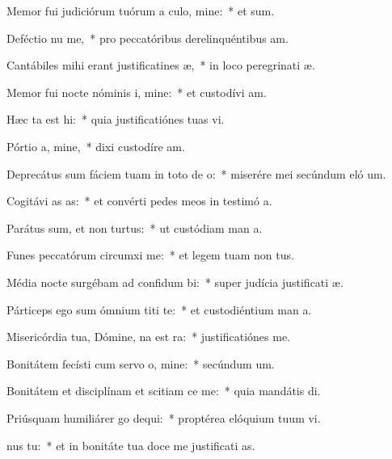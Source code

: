 \item Memor fui judiciórum tuórum a culo, mine:~* et  sum.
\item Deféctio nu me,~* pro peccatóribus derelinquéntibus  am.
\item Cantábiles mihi erant justificatines æ,~* in loco peregrinati æ.
\item Memor fui nocte nóminis i, mine:~* et custodívi  am.
\item Hæc ta est hi:~* quia justificatiónes tuas vi.
\item Pórtio a, mine,~* dixi custodíre  am.
\item Deprecátus sum fáciem tuam in toto de o:~* miserére mei secúndum eló um.
\item Cogitávi as as:~* et convérti pedes meos in testimó a.
\item Parátus sum, et non  turtus:~* ut custódiam man a.
\item Funes peccatórum circumxi  me:~* et legem tuam non  tus.
\item Média nocte surgébam ad confidum bi:~* super judícia justificati æ.
\item Párticeps ego sum ómnium titi te:~* et custodiéntium man a.
\item Misericórdia tua, Dómine, na est ra:~* justificatiónes   me.
\item Bonitátem fecísti cum servo o, mine:~* secúndum  um.
\item Bonitátem et disciplínam et scitiam ce me:~* quia mandátis  di.
\item Priúsquam humiliárer go dequi:~* proptérea elóquium tuum vi.
\item {}nus  tu:~* et in bonitáte tua doce me justificati as.
